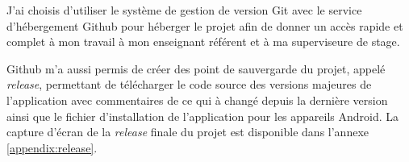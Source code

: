 J'ai choisis d'utiliser le système de gestion de version Git avec le service d'hébergement Github pour héberger le projet afin de donner un accès rapide et complet à mon travail à mon enseignant référent et à ma superviseure de stage.

Github m'a aussi permis de créer des point de sauvergarde du projet, appelé \textit{release}, permettant de télécharger le code source des versions majeures de l'application avec commentaires de ce qui à changé depuis la dernière version ainsi que le fichier d'installation de l'application pour les appareils Android. La capture d'écran de la \textit{release} finale du projet est disponible dans l'annexe \ref{appendix:release}.












